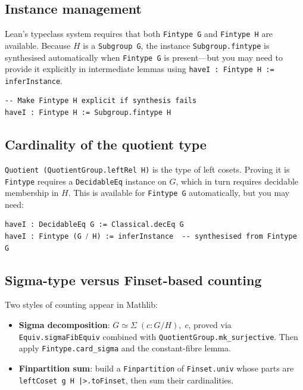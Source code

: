 \documentclass[11pt, a4paper]{article}
\theoremstyle{plain}
\theoremstyle{definition}
\newcommand{\lean}[1]{\texttt{\color{lean-blue}#1}}
\begin{document}
\subsection{Instance management}

Lean's typeclass system requires that both \lean{Fintype G} and
\lean{Fintype H} are available. Because $H$ is a \lean{Subgroup G}, the
instance \lean{Subgroup.fintype} is synthesised automatically when
\lean{Fintype G} is present---but you may need to provide it explicitly in
intermediate lemmas using \lean{haveI : Fintype H := inferInstance}.

\begin{lstlisting}
-- Make Fintype H explicit if synthesis fails
haveI : Fintype H := Subgroup.fintype H
\end{lstlisting}

\subsection{Cardinality of the quotient type}

\lean{Quotient (QuotientGroup.leftRel H)} is the type of left cosets.
Proving it is \lean{Fintype} requires a \lean{DecidableEq} instance on $G$,
which in turn requires decidable membership in $H$. This is available for
\lean{Fintype G} automatically, but you may need:

\begin{lstlisting}
haveI : DecidableEq G := Classical.decEq G
haveI : Fintype (G ⧸ H) := inferInstance  -- synthesised from Fintype G
\end{lstlisting}

\subsection{Sigma-type versus Finset-based counting}

Two styles of counting appear in Mathlib:

\begin{itemize}
  \item \textbf{Sigma decomposition}: $G \simeq \Sigma\; (c : G/H),\; c$,
    proved via \lean{Equiv.sigmaFibEquiv} combined with
    \lean{QuotientGroup.mk\_surjective}.  Then apply
    \lean{Fintype.card\_sigma} and the constant-fibre lemma.

  \item \textbf{Finpartition sum}: build a \lean{Finpartition} of
    \lean{Finset.univ} whose parts are \lean{leftCoset g H |>.toFinset},
    then sum their cardinalities.
\end{itemize}
\end{document}
